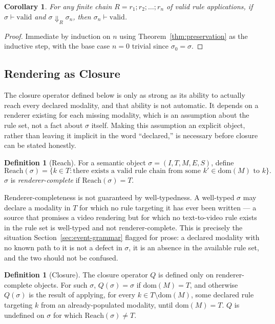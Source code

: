 \documentclass[11pt]{article}
\newtheorem{corollary}[theorem]{Corollary}
\theoremstyle{definition}
\newtheorem{definition}[theorem]{Definition}
\begin{document}
\begin{corollary}
\label{cor:chain-preservation}
For any finite chain $R = r_1; r_2; \dots; r_n$ of valid rule applications, if $\sigma \vdash \mathrm{valid}$ and $\sigma \Downarrow_R \sigma_n$, then $\sigma_n \vdash \mathrm{valid}$.
\end{corollary}

\begin{proof}
Immediate by induction on $n$ using Theorem~\ref{thm:preservation} as the inductive step, with the base case $n = 0$ trivial since $\sigma_0 = \sigma$.
\end{proof}

\subsection{Rendering as Closure}

The closure operator defined below is only as strong as its ability to actually reach every declared modality, and that ability is not automatic. It depends on a renderer existing for each missing modality, which is an assumption about the rule set, not a fact about $\sigma$ itself. Making this assumption an explicit object, rather than leaving it implicit in the word ``declared,'' is necessary before closure can be stated honestly.

\begin{definition}[Reach]
\label{def:reach}
For a semantic object $\sigma = (I, T, M, E, S)$, define
\[
\mathrm{Reach}(\sigma) = \{k \in T : \text{there exists a valid rule chain from some } k' \in \mathrm{dom}(M) \text{ to } k\}.
\]
$\sigma$ is \emph{renderer-complete} if $\mathrm{Reach}(\sigma) = T$.
\end{definition}

Renderer-completeness is not guaranteed by well-typedness. A well-typed $\sigma$ may declare a modality in $T$ for which no rule targeting it has ever been written --- a source that promises a video rendering but for which no text-to-video rule exists in the rule set is well-typed and not renderer-complete. This is precisely the situation Section~\ref{sec:event-grammar} flagged for prose: a declared modality with no known path to it is not a defect in $\sigma$, it is an absence in the available rule set, and the two should not be confused.

\begin{definition}[Closure]
\label{def:closure}
The closure operator $Q$ is defined only on renderer-complete objects. For such $\sigma$, $Q(\sigma) = \sigma$ if $\mathrm{dom}(M) = T$, and otherwise $Q(\sigma)$ is the result of applying, for every $k \in T \setminus \mathrm{dom}(M)$, some declared rule targeting $k$ from an already-populated modality, until $\mathrm{dom}(M) = T$. $Q$ is undefined on $\sigma$ for which $\mathrm{Reach}(\sigma) \neq T$.
\end{definition}
\end{document}
